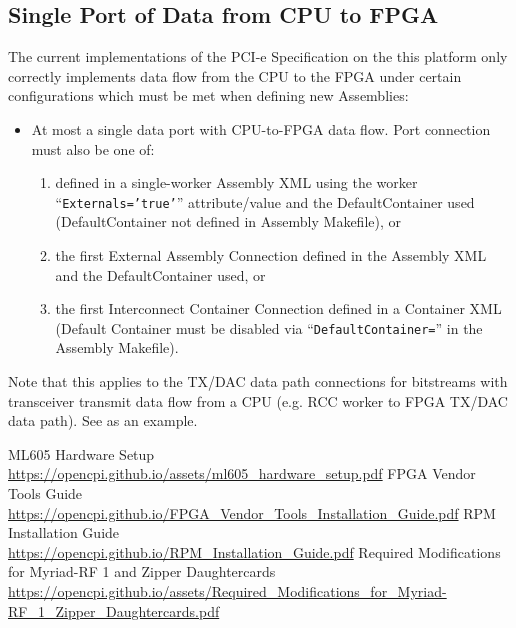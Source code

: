 \documentclass{article}
\begin{document}
\subsection{Single Port of Data from CPU to FPGA} %
\label{bug:3783}
The current implementations of the PCI-e Specification on the this platform only correctly implements data flow from the CPU to the FPGA under certain configurations which must be met when defining new Assemblies:
\begin{itemize}
\item At most a single data port with CPU-to-FPGA data flow. Port connection must also be one of:
\begin{enumerate}
\item defined in a single-worker Assembly XML using the worker ``\texttt{Externals='true'}'' attribute/value and the DefaultContainer used (DefaultContainer not defined in Assembly Makefile), or
\item the first External Assembly Connection defined in the Assembly XML and the DefaultContainer used, or
\item the first Interconnect Container Connection defined in a Container XML (Default Container must be disabled via ``\texttt{DefaultContainer=}'' in the Assembly Makefile).
\end{enumerate}
\end{itemize}
Note that this applies to the TX/DAC data path connections for bitstreams with transceiver transmit data flow from a CPU (e.g. RCC worker to FPGA TX/DAC data path). See  as an example.


\pagebreak
  \begin{thebibliography}{1}


   ML605 Hardware Setup\\
	 \url{https://opencpi.github.io/assets/ml605_hardware_setup.pdf}
   FPGA Vendor Tools Guide\\
	 \url{https://opencpi.github.io/FPGA_Vendor_Tools_Installation_Guide.pdf}
	    RPM Installation Guide\\
	 \url{https://opencpi.github.io/RPM_Installation_Guide.pdf}
	    Required Modifications for Myriad-RF 1 and Zipper Daughtercards\\
	 \url{https://opencpi.github.io/assets/Required_Modifications_for_Myriad-RF_1_Zipper_Daughtercards.pdf}

  \end{thebibliography}
\end{document}
